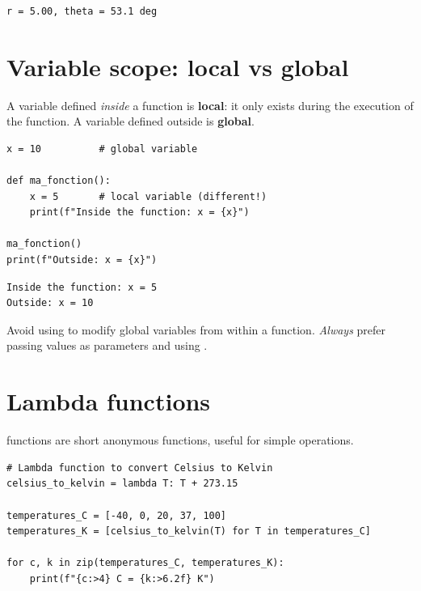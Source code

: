 \begin{codeoutput}
\begin{verbatim}
r = 5.00, theta = 53.1 deg
\end{verbatim}
\end{codeoutput}

\section{Variable scope: local vs global}

\begin{definition}[Scope]
A variable defined \emph{inside} a function is \textbf{local}: it only exists
during the execution of the function. A variable defined outside is
\textbf{global}.
\end{definition}

\begin{codeblock}[title=\textbf{Python}]
\begin{verbatim}
x = 10          # global variable

def ma_fonction():
    x = 5       # local variable (different!)
    print(f"Inside the function: x = {x}")

ma_fonction()
print(f"Outside: x = {x}")
\end{verbatim}
\end{codeblock}

\begin{codeoutput}
\begin{verbatim}
Inside the function: x = 5
Outside: x = 10
\end{verbatim}
\end{codeoutput}

\begin{warning}
Avoid using  to modify global variables from within a
function. \emph{Always} prefer passing values as parameters and using
.
\end{warning}

\section{Lambda functions}

 functions are short anonymous functions, useful for simple
operations.

\begin{codeblock}[title=\textbf{Python}]
\begin{verbatim}
# Lambda function to convert Celsius to Kelvin
celsius_to_kelvin = lambda T: T + 273.15

temperatures_C = [-40, 0, 20, 37, 100]
temperatures_K = [celsius_to_kelvin(T) for T in temperatures_C]

for c, k in zip(temperatures_C, temperatures_K):
    print(f"{c:>4} C = {k:>6.2f} K")
\end{verbatim}
\end{codeblock}

